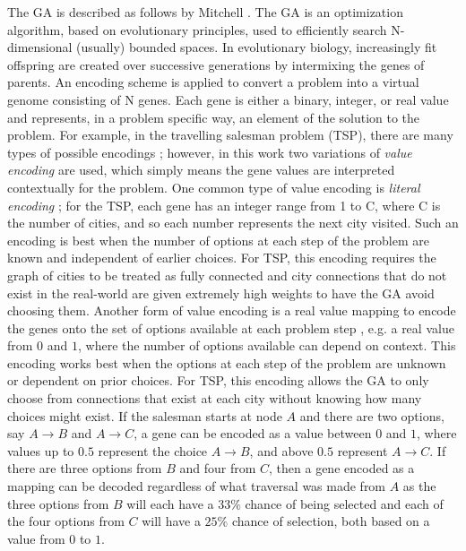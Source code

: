 \documentclass{llncs}
\begin{document}
	The GA is described as follows by Mitchell \cite{back_geneticalgorithm}. The GA is an optimization algorithm, based on evolutionary principles, used to efficiently search N-dimensional (usually) bounded spaces. In evolutionary biology, increasingly fit offspring are created over successive generations by intermixing the genes of parents. An encoding scheme is applied to convert a problem into a virtual genome consisting of N genes. Each gene is either a binary, integer, or real value and represents, in a problem specific way, an element of the solution to the problem. For example, in the travelling salesman problem (TSP), there are many types of possible encodings \cite{back_geneticalgorithm}; however, in this work two variations of \textit{value encoding} are used, which simply means the gene values are interpreted contextually for the problem. One common type of value encoding is \textit{literal encoding} \cite{back_geneticalgorithm}; for the TSP, each gene has an integer range from 1 to C, where C is the number of cities, and so each number represents the next city visited. Such an encoding is best when the number of options at each step of the problem are known and independent of earlier choices. For TSP, this encoding requires the graph of cities to be treated as fully connected and city connections that do not exist in the real-world are given extremely high weights to have the GA avoid choosing them. Another form of value encoding is a real value mapping to encode the genes onto the set of options available at each problem step \cite{back_geneticalgorithm}, e.g. a real value from $0$ and $1$, where the number of options available can depend on context. This encoding works best when the options at each step of the problem are unknown or dependent on prior choices. For TSP, this encoding allows the GA to only choose from connections that exist at each city without knowing how many choices might exist. If the salesman starts at node $A$ and there are two options, say $A \rightarrow B$ and $A \rightarrow C$, a gene can be encoded as a value between $0$ and $1$, where values up to $0.5$ represent the choice $A \rightarrow B$, and above $0.5$ represent $A \rightarrow C$. If there are three options from $B$ and four from $C$, then a gene encoded as a mapping can be decoded regardless of what traversal was made from $A$ as the three options from $B$ will each have a $33\%$ chance of being selected and each of the four options from $C$ will have a $25\%$ chance of selection, both based on a value from $0$ to $1$. 
	
\end{document}
